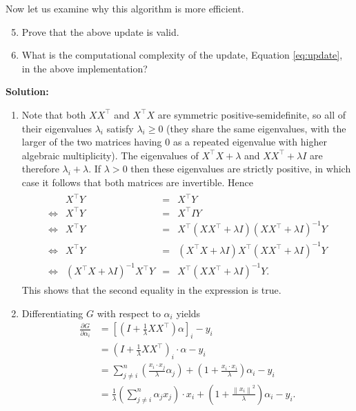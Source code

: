 \documentclass{article}
\newcommand{\solution}{\textbf{\vskip 0.2cm \large Solution:\\}}
\newcommand{\norm}[1]{\left\|#1\right\|}
\begin{document}
Now let us examine why this algorithm is more efficient.

\begin{enumerate}
\setcounter{enumi}{4} 
	\item Prove that the above update is valid.
	\item What is the computational complexity of the update, Equation \eqref{eq:update}, in the above implementation?
\end{enumerate}

\solution
\begin{enumerate}
	\item Note that both $XX^\top$ and $X^\top X$ are symmetric positive-semidefinite, so all of their eigenvalues $\lambda_i$ satisfy $\lambda_i\geq0$ (they share the same eigenvalues, with the larger of the two matrices having 0 as a repeated eigenvalue with higher algebraic multiplicity). The eigenvalues of $X^\top X+\lambda$ and $XX^\top + \lambda I$ are therefore $ \lambda_i + \lambda$. If $\lambda>0$ then these eigenvalues are strictly positive, in which case it follows that both matrices are invertible. Hence
	\begin{align}
		\begin{array}{crcl}
			&X^\top Y&=&X^\top Y \\
			\iff & X^\top Y &=& X^\top I Y \\
			\iff & X^\top Y &=& X^\top(XX^\top+\lambda I)(XX^\top+\lambda I)^{-1}Y \\
			\iff & X^\top Y &=& (X^\top X+\lambda I)X^\top(XX^\top+\lambda I)^{-1}Y \\
			\iff & (X^\top X+\lambda I)^{-1}X^\top Y &=& X^\top(XX^\top+\lambda I)^{-1}Y.
		\end{array}
	\end{align}
	This shows that the second equality in the expression is true.
	\item Differentiating $G$ with respect to $\alpha_i$ yields
	\begin{align*}
		\frac{\partial G}{\partial \alpha_i} &= [(I+\tfrac1\lambda XX^\top)\alpha]_i-y_i\\
		&= (I+\tfrac1\lambda XX^\top)_i\cdot \alpha - y_i\\
		&= \sum_{j\neq i}^n\left(\frac{x_i\cdot x_j}{\lambda}\alpha_j\right) + \left(1+\frac{x_i\cdot x_i}{\lambda} \right)\alpha_i-y_i\\
		&= \tfrac1\lambda\left(\sum_{j\neq i}^n \alpha_jx_j\right)\cdot x_i + \left(1+\frac{\norm{x_i}^2}{\lambda} \right)\alpha_i-y_i.
	\end{align*}

\end{enumerate}
\end{document}
